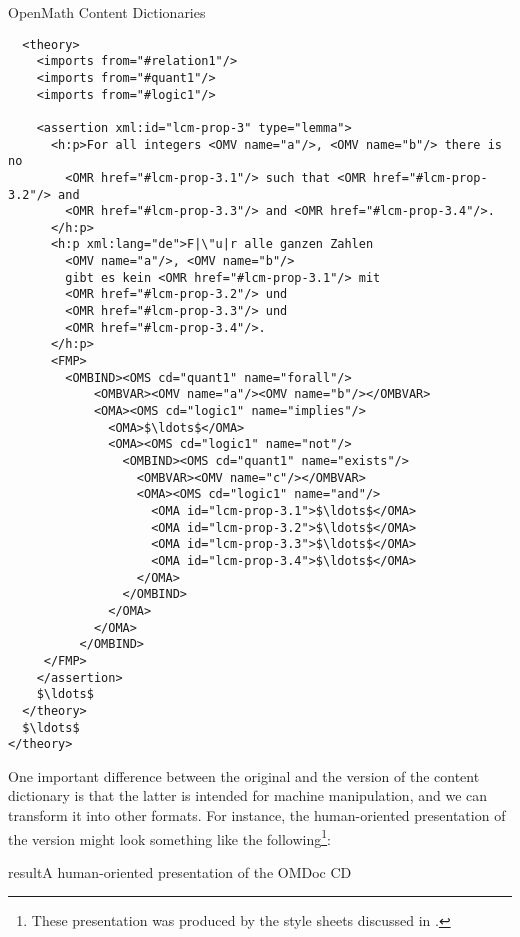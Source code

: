 \begin{omgroup}[id=omcds]{OpenMath Content Dictionaries}
\begin{lstlisting}
  <theory>
    <imports from="#relation1"/>
    <imports from="#quant1"/>
    <imports from="#logic1"/>

    <assertion xml:id="lcm-prop-3" type="lemma">
      <h:p>For all integers <OMV name="a"/>, <OMV name="b"/> there is no 
        <OMR href="#lcm-prop-3.1"/> such that <OMR href="#lcm-prop-3.2"/> and 
        <OMR href="#lcm-prop-3.3"/> and <OMR href="#lcm-prop-3.4"/>.
      </h:p>
      <h:p xml:lang="de">F|\"u|r alle ganzen Zahlen 
        <OMV name="a"/>, <OMV name="b"/> 
        gibt es kein <OMR href="#lcm-prop-3.1"/> mit   
        <OMR href="#lcm-prop-3.2"/> und 
        <OMR href="#lcm-prop-3.3"/> und 
        <OMR href="#lcm-prop-3.4"/>.
      </h:p>
      <FMP>
        <OMBIND><OMS cd="quant1" name="forall"/>
            <OMBVAR><OMV name="a"/><OMV name="b"/></OMBVAR>
            <OMA><OMS cd="logic1" name="implies"/>
              <OMA>$\ldots$</OMA>
              <OMA><OMS cd="logic1" name="not"/>
                <OMBIND><OMS cd="quant1" name="exists"/>
                  <OMBVAR><OMV name="c"/></OMBVAR>
                  <OMA><OMS cd="logic1" name="and"/>
                    <OMA id="lcm-prop-3.1">$\ldots$</OMA>
                    <OMA id="lcm-prop-3.2">$\ldots$</OMA>
                    <OMA id="lcm-prop-3.3">$\ldots$</OMA>
                    <OMA id="lcm-prop-3.4">$\ldots$</OMA>
                  </OMA>
                </OMBIND>
              </OMA>
            </OMA>
          </OMBIND>
     </FMP>
    </assertion> 
    $\ldots$
  </theory>
  $\ldots$
</theory>
\end{lstlisting}

\noindent One important difference between the original and the {\omdoc} version of the
{\openmath} content dictionary is that the latter is intended for machine manipulation,
and we can transform it into other formats. For instance, the human-oriented presentation
of the {\omdoc} version might look something like the following\footnote{These
  presentation was produced by the style sheets discussed in
  {}.}:

\begin{myfig}{result}{A human-oriented presentation of the OMDoc CD\vspace{-12pt}}
\hspace*{-12pt}
\end{myfig}
\end{omgroup}
